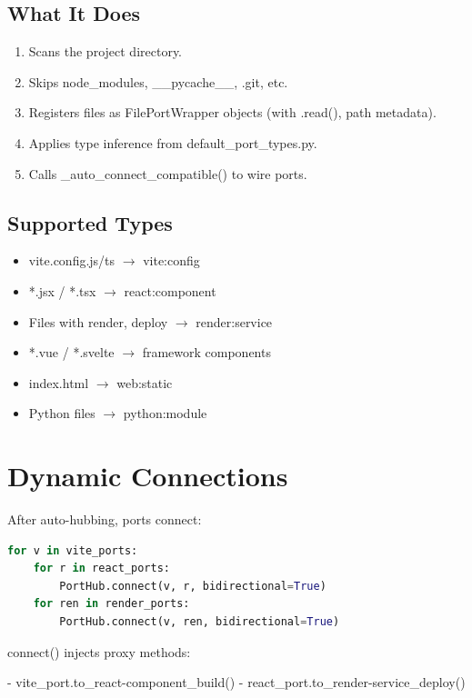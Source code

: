 \documentclass[11pt,a4paper]{article}
\begin{document}
\subsection{What It Does}
\begin{enumerate}
    \item Scans the project directory.
    \item Skips node\_modules, \_\_pycache\_\_, .git, etc.
    \item Registers files as FilePortWrapper objects (with .read(), path metadata).
    \item Applies type inference from default\_port\_types.py.
    \item Calls \_auto\_connect\_compatible() to wire ports.
\end{enumerate}

\subsection{Supported Types}

\begin{itemize}
    \item vite.config.js/ts \( \longrightarrow \) vite:config
    \item *.jsx / *.tsx \( \longrightarrow \) react:component
    \item Files with render, deploy \( \longrightarrow \) render:service
    \item *.vue / *.svelte \( \longrightarrow \) framework components
    \item index.html \( \longrightarrow \) web:static
    \item Python files \( \longrightarrow \) python:module
\end{itemize}

\section{Dynamic Connections}

After auto-hubbing, ports connect:

\begin{lstlisting}[language=Python]
for v in vite_ports:
    for r in react_ports:
        PortHub.connect(v, r, bidirectional=True)
    for ren in render_ports:
        PortHub.connect(v, ren, bidirectional=True)
\end{lstlisting}

connect() injects proxy methods:

- vite\_port.to\_react-component\_build()
- react\_port.to\_render-service\_deploy()
\end{document}
